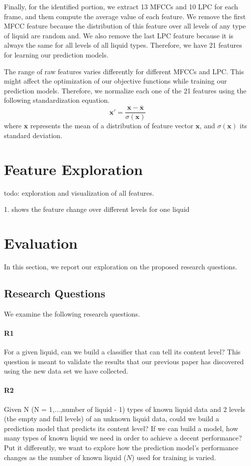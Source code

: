 \documentclass{article} %
\begin{document}
Finally, for the identified portion, we extract 13 MFCCs and 10 LPC for each frame, and them compute the average value of each feature. We remove the first MFCC feature because the distribution of this feature over all levels of any type of liquid are random and. We also remove the last LPC feature because it is always the same for all levels of all liquid types. Therefore, we have 21 features for learning our prediction models.

The range of raw features varies differently for different MFCCs and LPC. This might affect the optimization of our objective functions while training our prediction models. Therefore, we normalize each one of the 21 features using the following standardization equation.
\[\mathbf{x'} = \frac{\mathbf{x}-\overline{\mathbf{x}}}{\sigma(\mathbf{x})}\]
where $\overline{\mathbf{x}}$ represents the mean of a distribution of feature vector $\mathbf{x}$, and $\sigma(\mathbf{x})$ its standard deviation.
\section{Feature Exploration}
todo: exploration and visualization of all features.

1. shows the feature change over different levels for one liquid


\section{Evaluation}
In this section, we report our exploration on the proposed research questions.

\subsection{Research Questions}
We examine the following research questions.

\paragraph{R1} For a given liquid, can we build a classifier that can tell its content level? This question is meant to validate the results that our previous paper has discovered using the new data set we have collected.

\paragraph{R2} Given N (N = 1,...,number of liquid - 1) types of known liquid data and 2 levels (the empty and full levels) of an unknown liquid data, could we build a prediction model that predicts its content level? If we can build a model, how many types of known liquid we need in order to achieve a decent performance? Put it differently, we want to explore how the prediction model's performance changes as the number of known liquid ($N$) used for training is varied.
\end{document}
